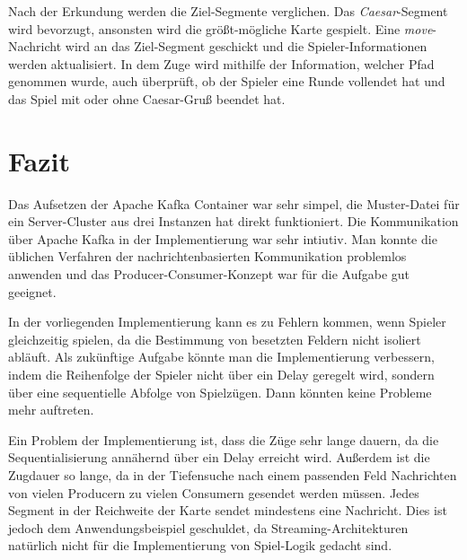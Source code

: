 \documentclass[]{article}
\begin{document}
Nach der Erkundung werden die Ziel-Segmente verglichen. Das \emph{Caesar}-Segment wird bevorzugt, ansonsten wird die größt-mögliche Karte gespielt. Eine \emph{move}-Nachricht wird an das Ziel-Segment geschickt und die Spieler-Informationen werden aktualisiert. In dem Zuge wird mithilfe der Information, welcher Pfad genommen wurde, auch überprüft, ob der Spieler eine Runde vollendet hat und das Spiel mit oder ohne Caesar-Gruß beendet hat.

\section{Fazit}
\label{sec:conclusion}

Das Aufsetzen der Apache Kafka Container war sehr simpel, die Muster-Datei für ein Server-Cluster aus drei Instanzen hat direkt funktioniert. Die Kommunikation über Apache Kafka in der Implementierung war sehr intiutiv. Man konnte die üblichen Verfahren der nachrichtenbasierten Kommunikation problemlos anwenden und das Producer-Consumer-Konzept war für die Aufgabe gut geeignet.\par
In der vorliegenden Implementierung kann es zu Fehlern kommen, wenn Spieler gleichzeitig spielen, da die Bestimmung von besetzten Feldern nicht isoliert abläuft. Als zukünftige Aufgabe könnte man die Implementierung verbessern, indem die Reihenfolge der Spieler nicht über ein Delay geregelt wird, sondern über eine sequentielle Abfolge von Spielzügen. Dann könnten keine Probleme mehr auftreten.\par
Ein Problem der Implementierung ist, dass die Züge sehr lange dauern, da die Sequentialisierung annähernd über ein Delay erreicht wird. Außerdem ist die Zugdauer so lange, da in der Tiefensuche nach einem passenden Feld Nachrichten von vielen Producern zu vielen Consumern gesendet werden müssen. Jedes Segment in der Reichweite der Karte sendet mindestens eine Nachricht. Dies ist jedoch dem Anwendungsbeispiel geschuldet, da Streaming-Architekturen natürlich nicht für die Implementierung von Spiel-Logik gedacht sind.
\end{document}
